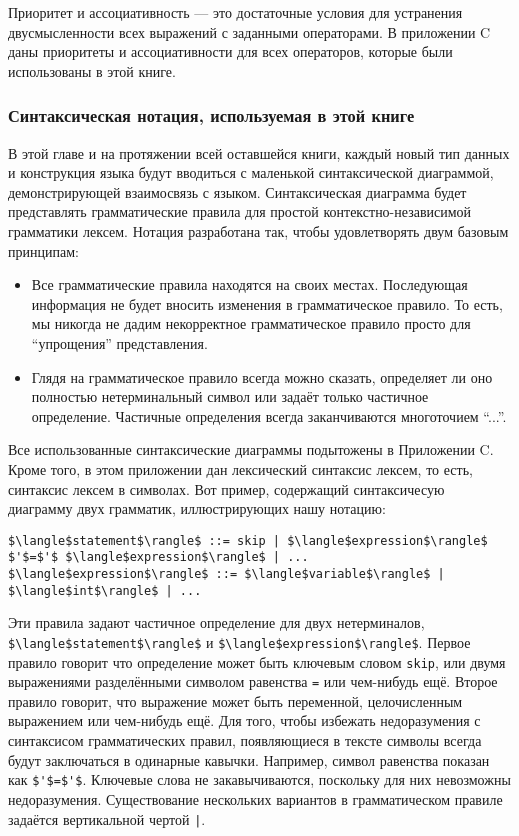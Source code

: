 Приоритет и ассоциативность --- это достаточные условия для устранения двусмысленности всех выражений с заданными операторами. В приложении C даны приоритеты и ассоциативности для всех операторов, которые были использованы в этой книге.

\subsubsection{Синтаксическая нотация, используемая в этой книге}

В этой главе и на протяжении всей оставшейся книги, каждый новый тип данных и конструкция языка будут вводиться с маленькой синтаксической диаграммой, демонстрирующей взаимосвязь с языком. Синтаксическая диаграмма будет представлять грамматические правила для простой контекстно-независимой грамматики лексем. Нотация разработана так, чтобы удовлетворять двум базовым принципам:

\begin{itemize}
\item{Все грамматические правила находятся на своих местах. Последующая информация не будет вносить изменения в грамматическое правило. То есть, мы никогда не дадим некорректное грамматическое правило просто для ``упрощения'' представления.}

\item{Глядя на грамматическое правило всегда можно сказать, определяет ли оно полностью нетерминальный символ или задаёт только частичное определение. Частичные определения всегда заканчиваются многоточием ``...''.}
\end{itemize}

Все использованные синтаксические диаграммы подытожены в Приложении C. Кроме того, в этом приложении дан лексический синтаксис лексем, то есть, синтаксис лексем в символах. Вот пример, содержащий синтаксичесую диаграмму двух грамматик, иллюстрирующих нашу нотацию:

\begin{lstlisting}
$\langle$statement$\rangle$ ::= skip | $\langle$expression$\rangle$ $'$=$'$ $\langle$expression$\rangle$ | ...
$\langle$expression$\rangle$ ::= $\langle$variable$\rangle$ | $\langle$int$\rangle$ | ...
\end{lstlisting}

Эти правила задают частичное определение для двух нетерминалов, \lstinline|$\langle$statement$\rangle$| и \lstinline|$\langle$expression$\rangle$|. Первое правило говорит что определение может быть ключевым словом \lstinline|skip|, или двумя выражениями разделёнными символом равенства \lstinline|=| или чем-нибудь ещё. Второе правило говорит, что выражение может быть переменной, целочисленным выражением или чем-нибудь ещё. Для того, чтобы избежать недоразумения с синтаксисом грамматических правил, появляющиеся в тексте символы всегда будут заключаться в одинарные кавычки. Например, символ равенства показан как \lstinline|$'$=$'$|. Ключевые слова не закавычиваются, поскольку для них невозможны недоразумения. Существование нескольких вариантов в грамматическом правиле задаётся вертикальной чертой \lstinline!|!.

